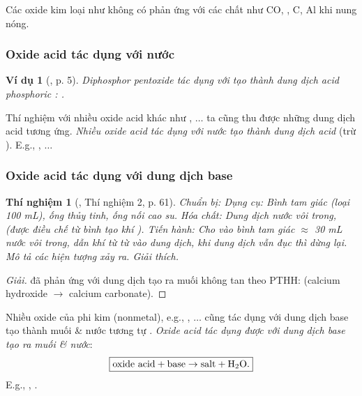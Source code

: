 \documentclass{article}
\newtheorem{thinghiem}{Thí nghiệm}
\newtheorem{vidu}{Ví dụ}
\begin{document}
Các oxide kim loại như  không có phản ứng với các chất như CO, , C, Al khi nung nóng.

\subsubsection{Oxide acid tác dụng với nước}

\begin{vidu}[\cite{SGK_Hoa_Hoc_9}, p. 5]
	Diphosphor pentoxide {\rm{}} tác dụng với {\rm{}} tạo thành dung dịch acid phosphoric {\rm{}: }.
\end{vidu}
Thí nghiệm với nhiều oxide acid khác như , $\ldots$ ta cũng thu được những dung dịch acid tương ứng. \textit{Nhiều oxide acid tác dụng với nước tạo thành dung dịch acid} (trừ ). E.g., , $\ldots$

\subsubsection{Oxide acid tác dụng với dung dịch base}

\begin{thinghiem}[\cite{SGK_KHTN_8_Canh_Dieu}, Thí nghiệm 2, p. 61]
	{\rm Chuẩn bị:} Dụng cụ: Bình tam giác (loại {\rm100 mL}), ống thủy tinh, ống nối cao su. Hóa chất: Dung dịch nước vôi trong, {\rm{}} (được điều chế từ bình tạo khí {\rm{}}). {\rm Tiến hành:} Cho vào bình tam giác $\approx$ {\rm30 mL} nước vôi trong, dẫn khí {\rm{}} từ từ vào dung dịch, khi dung dịch vẫn đục thì dừng lại. Mô tả các hiện tượng xảy ra. Giải thích.
\end{thinghiem}

\begin{proof}[Giải]
	 đã phản ứng với dung dịch  tạo ra muối  không tan theo PTHH:  (calcium hydroxide $\to$ calcium carbonate).
\end{proof}
Nhiều oxide của phi kim (nonmetal), e.g., , $\ldots$ cũng tác dụng với dung dịch base tạo thành muối \& nước tương tự . \textit{Oxide acid tác dụng được với dung dịch base tạo ra muối \& nước}:
\begin{align*}
	\boxed{\mbox{oxide acid} + \mbox{base}\to\mbox{salt} + \ce{H2O}.}
\end{align*}
E.g., , .
\end{document}
